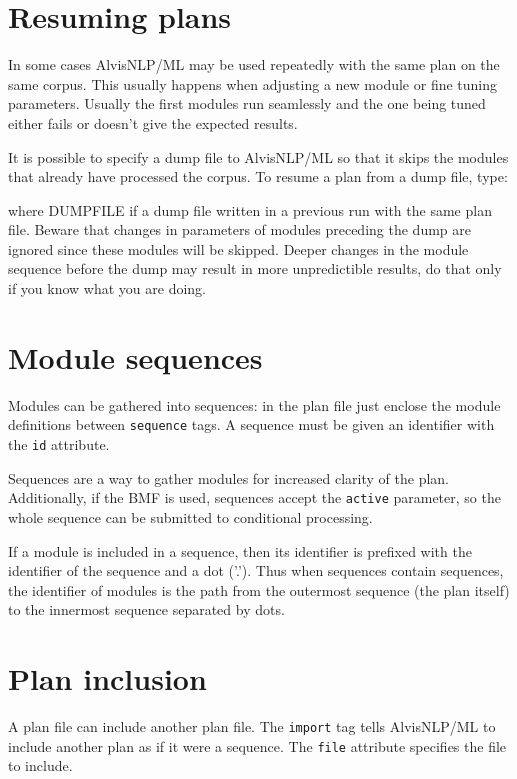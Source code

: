 \documentclass[a4paper]{book}
\begin{document}
\section{Resuming plans}
In some cases AlvisNLP/ML may be used repeatedly with the same plan on the same corpus.
This usually happens when adjusting a new module or fine tuning parameters.
Usually the first modules run seamlessly and the one being tuned either fails or doesn't give the expected results.

It is possible to specify a dump file to AlvisNLP/ML so that it skips the modules that already have processed the corpus.
To resume a plan from a dump file, type:


where DUMPFILE if a dump file written in a previous run with the same plan file.
Beware that changes in parameters of modules preceding the dump are ignored since these modules will be skipped.
Deeper changes in the module sequence before the dump may result in more unpredictible results, do that only if you know what you are doing.

\section{Module sequences}
Modules can be gathered into sequences: in the plan file just enclose the module definitions between \texttt{sequence} tags.
A sequence must be given an identifier with the \texttt{id} attribute.

Sequences are a way to gather modules for increased clarity of the plan.
Additionally, if the BMF is used, sequences accept the \texttt{active} parameter, so the whole sequence can be submitted to conditional processing.

If a module is included in a sequence, then its identifier is prefixed with the identifier of the sequence and a dot ('.').
Thus when sequences contain sequences, the identifier of modules is the path from the outermost sequence (the plan itself) to the innermost sequence separated by dots.

\section{Plan inclusion}
A plan file can include another plan file.
The \texttt{import} tag tells AlvisNLP/ML to include another plan as if it were a sequence.
The \texttt{file} attribute specifies the file to include.
\end{document}
